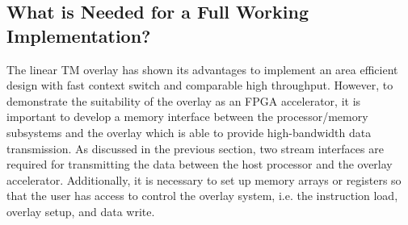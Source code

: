 \subsection{What is Needed for a Full Working Implementation?}
The linear TM overlay has shown its advantages to implement an area efficient design with fast context switch and comparable high throughput. 
However, to demonstrate the suitability of the overlay as an FPGA accelerator, it is important to develop a memory interface between the processor/memory subsystems and the overlay which is able to provide high-bandwidth data transmission. 
As discussed in the previous section, two stream interfaces are required for transmitting the data between the host processor and the overlay accelerator. 
Additionally, it is necessary to set up memory arrays or registers so that the user has access to control the overlay system, i.e. the instruction load, overlay setup, and data write. 

